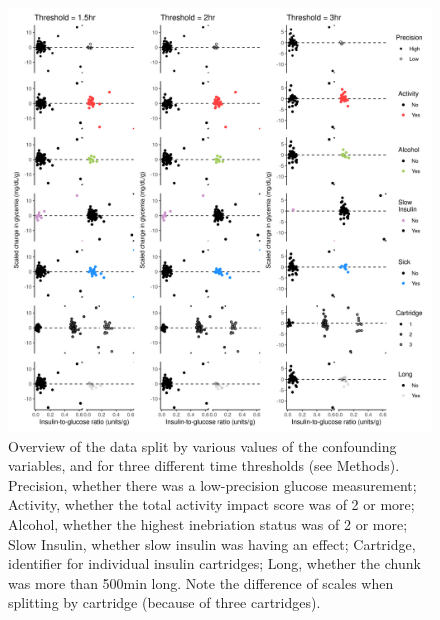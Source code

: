 \begin{figure}[H]
	\centering
	\includegraphics[width=\textwidth]{figures/overview_binary.png}
	\caption{Overview of the data split by various values of the confounding variables, and for three different time thresholds (see Methods). Precision, whether there was a low-precision glucose measurement; Activity, whether the total activity impact score was of 2 or more; Alcohol, whether the highest inebriation status was of 2 or more; Slow Insulin, whether slow insulin was having an effect; Cartridge, identifier for individual insulin cartridges; Long, whether the chunk was more than 500min long. Note the difference of scales when splitting by cartridge (because of three cartridges).}
	\label{fig:overview}
\end{figure}

\pagebreak

